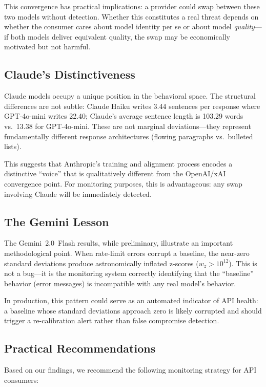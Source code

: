 \documentclass[11pt,twocolumn]{article}
\begin{document}
This convergence has practical implications: a provider could swap between these two models without detection.
Whether this constitutes a real threat depends on whether the consumer cares about model identity per se or about model \emph{quality}---if both models deliver equivalent quality, the swap may be economically motivated but not harmful.

\subsection{Claude's Distinctiveness}

Claude models occupy a unique position in the behavioral space.
The structural differences are not subtle: Claude Haiku writes 3.44 sentences per response where GPT-4o-mini writes 22.40; Claude's average sentence length is 103.29 words vs.\ 13.38 for GPT-4o-mini.
These are not marginal deviations---they represent fundamentally different response architectures (flowing paragraphs vs.\ bulleted lists).

This suggests that Anthropic's training and alignment process encodes a distinctive ``voice'' that is qualitatively different from the OpenAI/xAI convergence point.
For monitoring purposes, this is advantageous: any swap involving Claude will be immediately detected.

\subsection{The Gemini Lesson}

The Gemini~2.0~Flash results, while preliminary, illustrate an important methodological point.
When rate-limit errors corrupt a baseline, the near-zero standard deviations produce astronomically inflated z-scores ($w_z > 10^{12}$).
This is not a bug---it is the monitoring system correctly identifying that the ``baseline'' behavior (error messages) is incompatible with any real model's behavior.

In production, this pattern could serve as an automated indicator of API health: a baseline whose standard deviations approach zero is likely corrupted and should trigger a re-calibration alert rather than false compromise detection.

\subsection{Practical Recommendations}

Based on our findings, we recommend the following monitoring strategy for API consumers:
\end{document}
